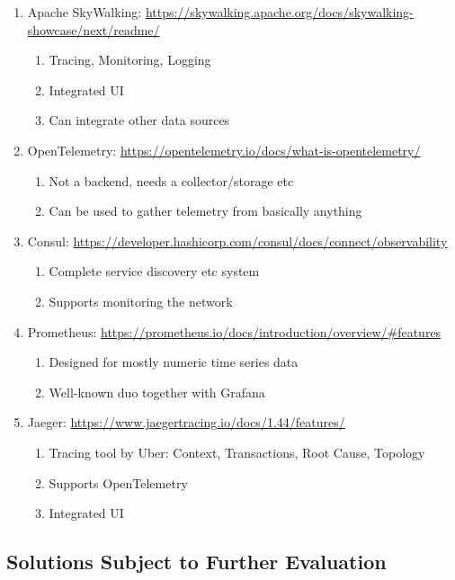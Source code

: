 \begin{enumerate}
\begin{enumerate}
    \end{enumerate}
    \item Apache SkyWalking: \url{https://skywalking.apache.org/docs/skywalking-showcase/next/readme/}
    \begin{enumerate}
        \item Tracing, Monitoring, Logging
        \item Integrated UI
        \item Can integrate other data sources
    \end{enumerate}
    \item OpenTelemetry: \url{https://opentelemetry.io/docs/what-is-opentelemetry/}
    \begin{enumerate}
        \item Not a backend, needs a collector/storage etc
        \item Can be used to gather telemetry from basically anything
    \end{enumerate}
    \item Consul: \url{https://developer.hashicorp.com/consul/docs/connect/observability}
    \begin{enumerate}
        \item Complete service discovery etc system
        \item Supports monitoring the network
    \end{enumerate}
    \item Prometheus: \url{https://prometheus.io/docs/introduction/overview/#features}
    \begin{enumerate}
        \item Designed for mostly numeric time series data
        \item Well-known duo together with Grafana
    \end{enumerate}
    \item Jaeger: \url{https://www.jaegertracing.io/docs/1.44/features/}
    \begin{enumerate}
        \item Tracing tool by Uber: Context, Transactions, Root Cause, Topology
        \item Supports OpenTelemetry
        \item Integrated UI
    \end{enumerate}
\end{enumerate}

\subsection{Solutions Subject to Further Evaluation}

